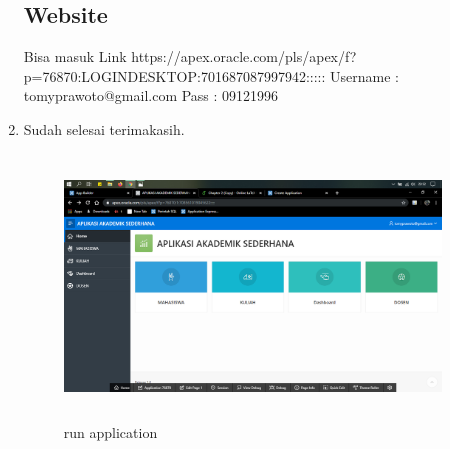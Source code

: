 \begin{enumerate}
\subsection{Website} 
\par Bisa masuk Link https://apex.oracle.com/pls/apex/f?p=76870:LOGINDESKTOP:701687087997942::::: Username : tomyprawoto@gmail.com Pass : 09121996
\item Sudah selesai terimakasih.
\begin{figure}[!htbp]
\centering
\includegraphics[width=10cm,height=7cm]{figures/H9.PNG}
\caption{run application}
\label{penanda}
\end{figure}
\end{enumerate}

